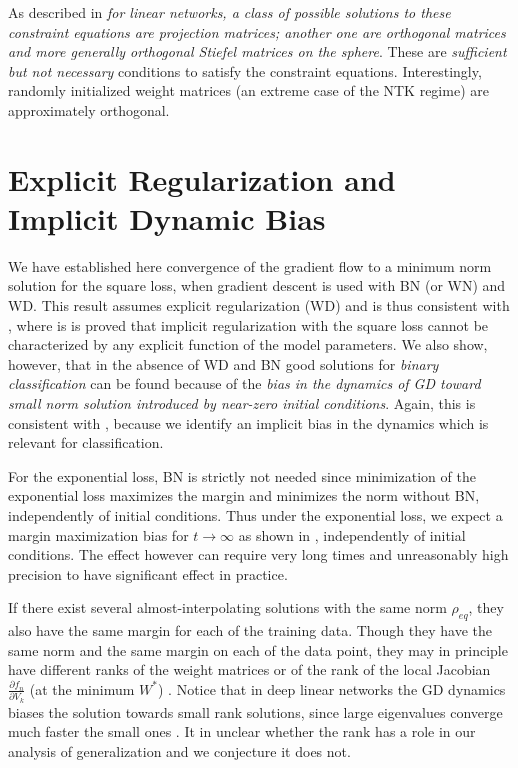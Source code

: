 \documentclass[11pt]{article}
\begin{document}
\begin{itemize}
As described in \cite{PoggioLiaoArxiv2020} {\it for linear networks, a
  class of possible solutions to these constraint equations are
  projection matrices; another one are orthogonal matrices and more
  generally orthogonal Stiefel matrices on the sphere}. These are {\it
  sufficient but not necessary} conditions to satisfy the constraint
equations. Interestingly, randomly initialized weight matrices (an
extreme case of the NTK regime) are approximately orthogonal.
\end{itemize}


\section{Explicit Regularization and Implicit Dynamic Bias}



We have established here convergence of the gradient flow to a minimum
norm solution for the square loss, when gradient descent is used with
BN (or WN) and WD. This result assumes explicit regularization (WD)
and is thus consistent  with 
\cite{Vardi2020ImplicitRI}, where is is proved that implicit regularization with
the square loss cannot be characterized by any explicit function of
the model parameters. We also show, however, that in the absence of WD
and BN good solutions for {\it binary classification} can be found
because of the {\it  bias in the dynamics of GD toward small
norm solution introduced by near-zero initial conditions}. Again, this
is consistent with \cite{Vardi2020ImplicitRI}, because we identify an
implicit bias in the dynamics which is relevant for classification.

For the exponential loss, BN is strictly not needed since minimization
of the exponential loss maximizes the margin and minimizes the norm
without BN, independently of initial conditions. Thus under the
exponential loss, we expect a margin maximization bias for
$t \to \infty$ as shown in \cite{PNAS2020}, independently of initial
conditions. The effect however can require very long times and
unreasonably high precision to have significant effect in practice.

If there exist several almost-interpolating solutions with the same
norm $\rho_{eq}$, they also have the same margin for each of the
training data.  Though they have the same norm and the same margin on
each of the data point, they may in principle have different ranks of the weight
matrices or of the rank of the local Jacobian
$\frac{\partial f_n}{\partial V_k}$ (at the minimum $W^*$) . Notice
that in deep linear networks the GD dynamics biases the
solution towards small rank solutions, since large eigenvalues
converge much faster the small ones \cite{2019arXiv190912051G}. It in
unclear whether the rank has a role in our analysis of generalization
and we conjecture it does not.
\end{document}

